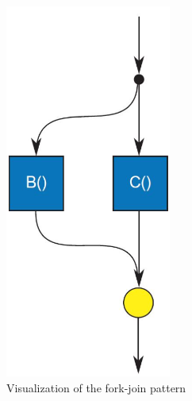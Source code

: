 \begin{figure}[ht]
    \begin{subfigure}[b]{0.475\textwidth}
       \centering
       \includegraphics[width=0.60\textwidth]{arrow/fork.png}
        \caption{Visualization of the fork-join pattern \cite{mccoolStructuredParallelPrograming2012}}
        \label{SArrow:fig:fork}
    \end{subfigure}
    \hfill
   \begin{subfigure}[b]{0.475\textwidth}
        \centering

\end{subfigure}
\end{figure}

